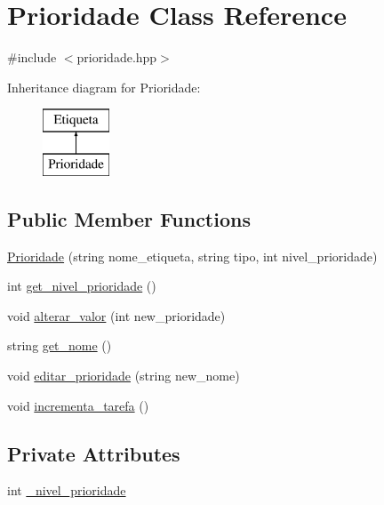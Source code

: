 \hypertarget{classPrioridade}{}\section{Prioridade Class Reference}
\label{classPrioridade}


{\ttfamily \#include $<$prioridade.\+hpp$>$}

Inheritance diagram for Prioridade\+:\begin{figure}[H]
\begin{center}
\leavevmode
\includegraphics[height=2.000000cm]{classPrioridade}
\end{center}
\end{figure}
\subsection*{Public Member Functions}
\begin{DoxyCompactItemize}
\item 
\hyperlink{classPrioridade_adcad6f20e5c15a659968e088c8dd642e}{Prioridade} (string nome\+\_\+etiqueta, string tipo, int nivel\+\_\+prioridade)
\item 
int \hyperlink{classPrioridade_a9660b4662782a91b1061217f9122034a}{get\+\_\+nivel\+\_\+prioridade} ()
\item 
void \hyperlink{classPrioridade_ac9f930199df2060972b589c4f40ef3c7}{alterar\+\_\+valor} (int new\+\_\+prioridade)
\item 
string \hyperlink{classPrioridade_a01c961e447cff5a75d4400e6bcf59bb9}{get\+\_\+nome} ()
\item 
void \hyperlink{classPrioridade_a8457dcba4fb03aeb7ae5505d5d25226d}{editar\+\_\+prioridade} (string new\+\_\+nome)
\item 
void \hyperlink{classPrioridade_a8895aedea7a5c69c073d69e3dec802f6}{incrementa\+\_\+tarefa} ()
\end{DoxyCompactItemize}
\subsection*{Private Attributes}
\begin{DoxyCompactItemize}
\item 
int \hyperlink{classPrioridade_a33d58f99a6bab88419583a66b0a8e3b5}{\+\_\+nivel\+\_\+prioridade}
\end{DoxyCompactItemize}
